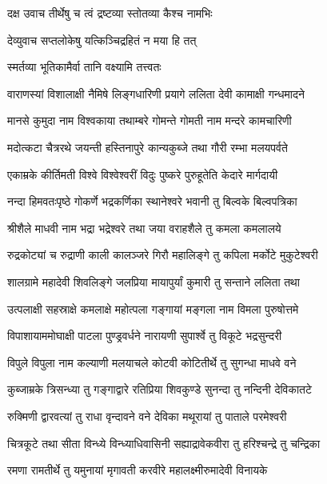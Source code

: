 {दक्ष उवाच}
{तीर्थेषु च त्वं द्रष्टव्या स्तोतव्या कैश्च नामभिः}

{देव्युवाच}
{सप्तलोकेषु यत्किञ्चिद्रहितं न मया हि तत्}

{स्मर्तव्या भूतिकामैर्वा तानि वक्ष्यामि तत्त्वतः}

\twolineshloka
{वाराणस्यां विशालाक्षी नैमिषे लिङ्गधारिणी}
{प्रयागे ललिता देवी कामाक्षी गन्धमादने}

\twolineshloka
{मानसे कुमुदा नाम विश्वकाया तथाम्बरे}
{गोमन्ते गोमती नाम मन्दरे कामचारिणी}

\twolineshloka
{मदोत्कटा चैत्ररथे जयन्ती हस्तिनापुरे}
{कान्यकुब्जे तथा गौरी रम्भा मलयपर्वते}

\twolineshloka
{एकाम्रके कीर्तिमती विश्वे विश्वेश्वरीं विदुः}
{पुष्करे पुरुहूतेति केदारे मार्गदायी}

\twolineshloka
{नन्दा हिमवतःपृष्ठे गोकर्णे भद्रकर्णिका}
{स्थानेश्वरे भवानी तु बिल्वके बिल्वपत्रिका}

\twolineshloka
{श्रीशैले माधवी नाम भद्रा भद्रेश्वरे तथा}
{जया वराहशैले तु कमला कमलालये}

\twolineshloka
{रुद्रकोट्यां च रुद्राणी काली कालञ्जरे गिरौ}
{महालिङ्गे तु कपिला मर्कोटे मुकुटेश्वरी}

\twolineshloka
{शालग्रामे महादेवी शिवलिङ्गे जलप्रिया}
{मायापुर्यां कुमारी तु सन्ताने ललिता तथा}

\twolineshloka
{उत्पलाक्षी सहस्राक्षे कमलाक्षे महोत्पला}
{गङ्गायां मङ्गला नाम विमला पुरुषोत्तमे}

\twolineshloka
{विपाशायाममोघाक्षी पाटला पुण्ड्रवर्धने}
{नारायणी सुपार्श्वे तु विकूटे भद्रसुन्दरी}

\twolineshloka
{विपुले विपुला नाम कल्याणी मलयाचले}
{कोटवी कोटितीर्थे तु सुगन्धा माधवे वने}

\twolineshloka
{कुब्जाम्रके त्रिसन्ध्या तु गङ्गाद्वारे रतिप्रिया}
{शिवकुण्डे सुनन्दा तु नन्दिनी देविकातटे}

\twolineshloka
{रुक्मिणी द्वारवत्यां तु राधा वृन्दावने वने}
{देविका मथूरायां तु पाताले परमेश्वरी}

\twolineshloka
{चित्रकूटे तथा सीता विन्ध्ये विन्ध्याधिवासिनी}
{सह्याद्रावेकवीरा तु हरिश्चन्द्रे तु चन्द्रिका}

\twolineshloka
{रमणा रामतीर्थे तु यमुनायां मृगावती}
{करवीरे महालक्ष्मीरुमादेवी विनायके}

